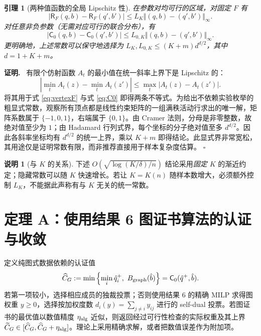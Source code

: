 \documentclass[11pt,a4paper]{ctexart}
\newtheorem{lemma}[theorem]{引理}
\theoremstyle{definition}
\newtheorem{remark}[theorem]{说明}
\newenvironment{proofcn}{\par\noindent\textbf{证明.}\ }{\hfill$\square$\par}
\newcommand{\Rsk}{\mathsf R}
\newcommand{\CGraph}{\mathsf C_0}
\newcommand{\hC}{\widehat C}
\begin{document}
\begin{lemma}[两种值函数的全局 Lipschitz 性]\label{lem:lip}
在参数对均可行的区域，对固定 $F$ 有
\begin{equation}\label{eq:LipF}
|\Rsk_F(q,b)-\Rsk_F(q',b')|\le L_K\Vert(q,b)-(q',b')\Vert_\infty.
\end{equation}
对任意非负参数（无需对应可行的联合分布），有
\begin{equation}\label{eq:LipC}
|\CGraph(q,b)-\CGraph(q',b')|\le L_{0,K}\Vert(q,b)-(q',b')\Vert_\infty.
\end{equation}
更明确地，上述常数可以保守地选择为 $L_K,L_{0,K}\le (K+m)d^{d/2}$，其中 $d=1+K+m$。
\end{lemma}
\begin{proofcn}
有限个仿射函数 $A_t$ 的最小值在统一斜率上界下是 Lipschitz 的：
\[|\min_tA_t(z)-\min_tA_t(z')|\le\max_t|A_t(z)-A_t(z')|.\]
将其用于式 \eqref{eq:vertexF} 与式 \eqref{eq:C0} 即得两条不等式。为给出不依赖实验枚举的粗显式常数，观察所有顶点都是线性约束矩阵的一组满秩活动行求出的唯一解，矩阵系数属于 $\{-1,0,1\}$，右端属于 $\{0,1\}$。由 Cramer 法则，分母是非零整数，故绝对值至少为 $1$；由 Hadamard 行列式界，每个坐标的分子绝对值至多 $d^{d/2}$。因此各斜率坐标均有 $d^{d/2}$ 的统一上界，乘以 $K+m$ 即得结论。此显式界非常宽松，其用途仅是证明常数有限，而非推荐直接用于样本复杂度估算。
\end{proofcn}

\begin{remark}[与 $K$ 的关系]
下述 $O(\sqrt{\log(K/\delta)/n})$ 结论采用\emph{固定 $K$} 的渐近约定；隐藏常数可以随 $K$ 快速增长。若让 $K=K(n)$ 随样本数增大，必须额外控制 $L_K$，不能据此声称有与 $K$ 无关的统一常数。
\end{remark}

\section{定理 A：使用结果 6 图证书算法的认证与收敛}
定义纯图式数据依赖的认证值
\begin{equation}\label{eq:graphcert}
\hC_G:=\min\left\{\min_i\hat q_i^+,\ B_{\rm graph}(\hat b)\right\}=\CGraph(\hat q^+,\hat b).
\end{equation}
若第一项较小，选择相应成员的独裁投票；否则使用结果 6 的精确 MILP 求得图权重 $y\ge0$，选择按加权度数 $d_i(y)=\sum_{j\ne i}y_{ij}$ 进行的 self-dual 投票。若图证书的最优值以数值精度 $\eta_{\rm alg}$ 近似，则返回经过可行性检查的实际权重及其上界 $\widetilde C_G\in[\hC_G,\hC_G+\eta_{\rm alg}]$。理论上采用精确求解，或者把数值误差作为附加项。
\end{document}

